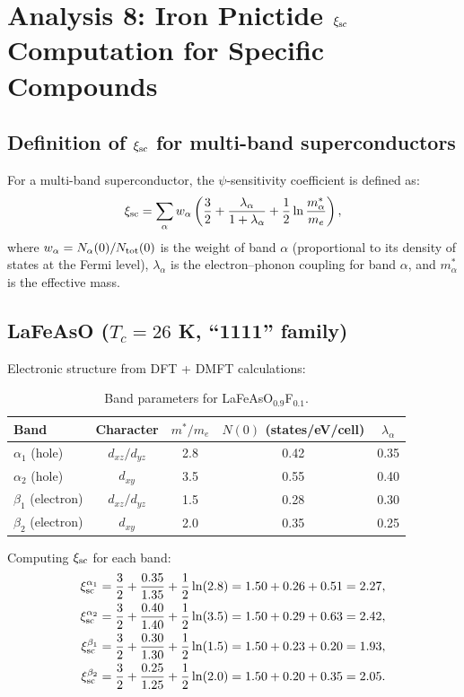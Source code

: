 \documentclass[11pt]{article}
\begin{document}
\section{Analysis 8: Iron Pnictide $\xi_{\rm sc}$ Computation for Specific Compounds}
\label{sec:iron-xi}

\subsection{Definition of $\xi_{\rm sc}$ for multi-band superconductors}

For a multi-band superconductor, the $\psi$-sensitivity coefficient is defined as:
\begin{equation}
\xi_{\rm sc} = \sum_\alpha w_\alpha\left(\frac{3}{2} + \frac{\lambda_\alpha}{1+\lambda_\alpha} + \frac{1}{2}\ln\frac{m_\alpha^*}{m_e}\right),
\end{equation}
where $w_\alpha = N_\alpha(0)/N_{\rm tot}(0)$ is the weight of band $\alpha$ (proportional to its density of states at the Fermi level), $\lambda_\alpha$ is the electron--phonon coupling for band $\alpha$, and $m_\alpha^*$ is the effective mass.

\subsection{LaFeAsO ($T_c = 26$ K, ``1111'' family)}

Electronic structure from DFT + DMFT calculations:

\begin{table}[h]
\centering
\caption{Band parameters for LaFeAsO$_{0.9}$F$_{0.1}$.}
\begin{tabular}{lcccc}
\toprule
Band & Character & $m^*/m_e$ & $N(0)$ (states/eV/cell) & $\lambda_\alpha$ \\
\midrule
$\alpha_1$ (hole) & $d_{xz}/d_{yz}$ & 2.8 & 0.42 & 0.35 \\
$\alpha_2$ (hole) & $d_{xy}$ & 3.5 & 0.55 & 0.40 \\
$\beta_1$ (electron) & $d_{xz}/d_{yz}$ & 1.5 & 0.28 & 0.30 \\
$\beta_2$ (electron) & $d_{xy}$ & 2.0 & 0.35 & 0.25 \\
\bottomrule
\end{tabular}
\end{table}

Computing $\xi_{\rm sc}$ for each band:
\begin{align}
\xi_{\rm sc}^{\alpha_1} &= \frac{3}{2} + \frac{0.35}{1.35} + \frac{1}{2}\ln(2.8) = 1.50 + 0.26 + 0.51 = 2.27, \\
\xi_{\rm sc}^{\alpha_2} &= \frac{3}{2} + \frac{0.40}{1.40} + \frac{1}{2}\ln(3.5) = 1.50 + 0.29 + 0.63 = 2.42, \\
\xi_{\rm sc}^{\beta_1} &= \frac{3}{2} + \frac{0.30}{1.30} + \frac{1}{2}\ln(1.5) = 1.50 + 0.23 + 0.20 = 1.93, \\
\xi_{\rm sc}^{\beta_2} &= \frac{3}{2} + \frac{0.25}{1.25} + \frac{1}{2}\ln(2.0) = 1.50 + 0.20 + 0.35 = 2.05.
\end{align}
\end{document}
